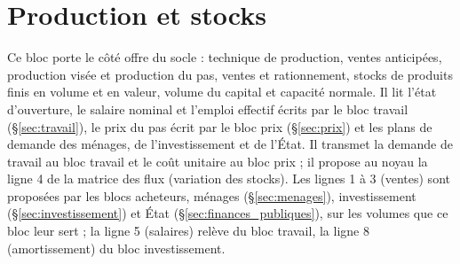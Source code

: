 \documentclass[11pt,a4paper]{article}
\begin{document}
\section{Production et stocks}
\label{sec:production}
Ce bloc porte le côté offre du socle : technique de production, ventes anticipées, production visée et production du pas, ventes et rationnement, stocks de produits finis en volume et en valeur, volume du capital et capacité normale. Il lit l'état d'ouverture, le salaire nominal et l'emploi effectif écrits par le bloc travail (\S\ref{sec:travail}), le prix du pas écrit par le bloc prix (\S\ref{sec:prix}) et les plans de demande des ménages, de l'investissement et de l'État. Il transmet la demande de travail au bloc travail et le coût unitaire au bloc prix ; il propose au noyau la ligne 4 de la matrice des flux (variation des stocks). Les lignes 1 à 3 (ventes) sont proposées par les blocs acheteurs, ménages (\S\ref{sec:menages}), investissement (\S\ref{sec:investissement}) et État (\S\ref{sec:finances_publiques}), sur les volumes que ce bloc leur sert ; la ligne 5 (salaires) relève du bloc travail, la ligne 8 (amortissement) du bloc investissement.
\end{document}

